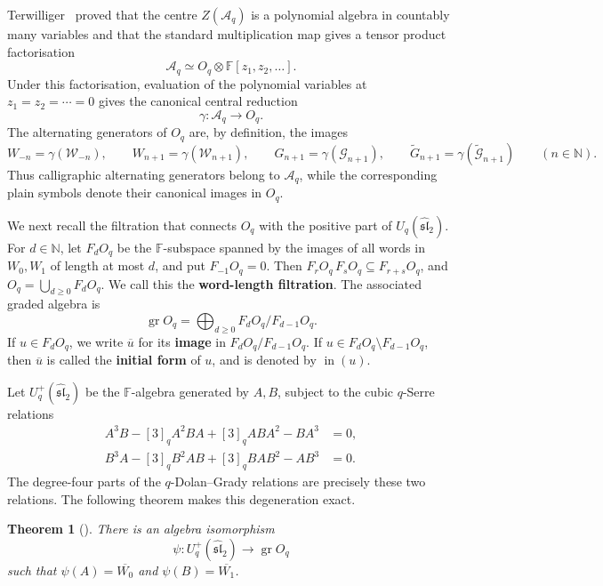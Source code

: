 \documentclass[11pt]{extarticle}
\newtheorem{theorem}{Theorem}[section]
\theoremstyle{definition}
\theoremstyle{remark}
\numberwithin{equation}{section}
\newcommand{\F}{\mathbb F}
\newcommand{\N}{\mathbb N}
\newcommand{\Oq}{O_q}
\newcommand{\Aq}{\mathcal A_q}
\newcommand{\Uplus}{U_q^+(\widehat{\mathfrak{sl}}_2)}
\newcommand{\gr}{\operatorname{gr}}
\newcommand{\init}{\operatorname{in}}
\newcommand{\cW}{\mathcal W}
\newcommand{\cG}{\mathcal G}
\newcommand{\ctG}{\widetilde{\mathcal G}}
\begin{document}
Terwilliger~\cite{Terwilliger2021ACE,Terwilliger2022OqACE} proved that the centre \(Z(\Aq)\) is a polynomial algebra in
countably many variables and that the standard multiplication map gives a
tensor product factorisation
\begin{equation}
\label{eq:standard-factorisation-intro}
        \Aq\simeq \Oq\otimes\F[z_1,z_2,\ldots].
\end{equation}
Under this factorisation, evaluation of the polynomial variables at
\(z_1=z_2=\cdots=0\) gives the canonical central reduction
\[
        \gamma:\Aq\longrightarrow\Oq .
\]
The alternating generators of \(\Oq\) are, by definition, the images
\[
 W_{-n}=\gamma(\cW_{-n}),\qquad
 W_{n+1}=\gamma(\cW_{n+1}),\qquad
 G_{n+1}=\gamma(\cG_{n+1}),\qquad
 \widetilde G_{n+1}=\gamma(\ctG_{n+1})
 \qquad(n\in\N).
\]
Thus calligraphic alternating generators belong to \(\Aq\), while the
corresponding plain symbols denote their canonical images in \(\Oq\).

We next recall the filtration that connects \(\Oq\) with the positive part
of \(U_q(\widehat{\mathfrak{sl}}_2)\).  For \(d\in\N\), let \(F_d\Oq\) be
the \(\F\)-subspace spanned by the images of all words in \(W_0,W_1\) of
length at most \(d\), and put \(F_{-1}\Oq=0\).  Then
\(F_r\Oq\,F_s\Oq\subseteq F_{r+s}\Oq\), and
\(\Oq=\bigcup_{d\geq0}F_d\Oq\).  We call this the \textbf{word-length filtration}.
The associated graded algebra is
\[
        \gr\Oq=\bigoplus_{d\geq0}F_d\Oq/F_{d-1}\Oq .
\]
If \(u\in F_d\Oq\), we write \(\overline u\) for its \textbf{image} in
\(F_d\Oq/F_{d-1}\Oq\).  If \(u\in F_d\Oq\setminus F_{d-1}\Oq\), then
\(\overline u\) is called the \textbf{initial form} of \(u\), and is denoted by
\(\init(u)\).

Let \(\Uplus\) be the \(\F\)-algebra generated by \(A,B\), subject to the
cubic \(q\)-Serre relations
\begin{align*}
A^3B-[3]_qA^2BA+[3]_qABA^2-BA^3&=0,\\
B^3A-[3]_qB^2AB+[3]_qBAB^2-AB^3&=0.
\end{align*}
The degree-four parts of the \(q\)-Dolan--Grady relations are precisely
these two relations.  The following theorem makes this degeneration exact.

\begin{theorem}[{{\cite[Theorem~4.4]{Terwilliger2017PositivePart}}}]
\label{thm:gr-isomorphism}
There is an algebra isomorphism
\[
        \psi:\Uplus\longrightarrow\gr\Oq
\]
such that \(\psi(A)=\overline{W_0}\) and
\(\psi(B)=\overline{W_1}\).
\end{theorem}
\end{document}
